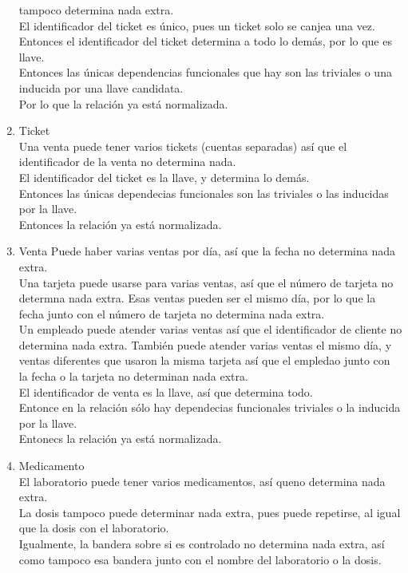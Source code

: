 \documentclass[10pt]{article}
\begin{document}
\begin{enumerate}
	tampoco determina nada extra.\\
	El identificador del ticket es único, pues un ticket solo se canjea una vez.
	Entonces el identificador del ticket determina a todo lo demás, por lo que
	es llave.\\
	Entonces las únicas dependencias funcionales que hay son las triviales o una
	inducida por una llave candidata.\\
	Por lo que la relación ya está normalizada.
	\item Ticket \\
	Una venta puede tener varios tickets (cuentas separadas) así que el
	identificador de la venta no determina nada.\\
	El identificador del ticket es la llave, y determina lo demás.\\
	Entonces las únicas dependecias funcionales son las triviales o las
	inducidas por la llave.\\
	Entonces la relación ya está normalizada.
	\item {Venta}
	Puede haber varias ventas por día, así que la fecha no determina nada extra.\\
	Una tarjeta puede usarse para varias ventas, así que el número de tarjeta no
	determna nada extra. Esas ventas pueden ser el mismo día, por lo que la fecha
	junto con el número de tarjeta no determina nada extra.\\
	Un empleado puede atender varias ventas así que el identificador de cliente
	no determina nada extra. También puede atender varias ventas el mismo día, y
	ventas diferentes que usaron la misma tarjeta así que el empledao junto con
	la fecha o la tarjeta no determinan nada extra.\\
	El identificador de venta es la llave, así que determina todo.\\
	Entonce en la relación sólo hay dependecias funcionales triviales o la
	inducida por la llave.\\
	Entonecs la relación ya está normalizada.
	\item Medicamento \\
	El laboratorio puede tener varios medicamentos, así queno determina nada
	extra. \\
	La dosis tampoco puede determinar nada extra, pues puede repetirse, al igual
	que la dosis con el laboratorio.\\
	Igualmente, la bandera sobre si es controlado no determina nada extra, así
	como tampoco esa bandera junto con el nombre del laboratorio o la dosis.\\

\end{enumerate}
\end{document}
